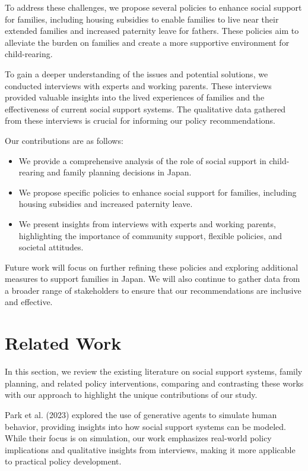\documentclass{article} %
\begin{document}
To address these challenges, we propose several policies to enhance social support for families, including housing subsidies to enable families to live near their extended families and increased paternity leave for fathers. These policies aim to alleviate the burden on families and create a more supportive environment for child-rearing.

To gain a deeper understanding of the issues and potential solutions, we conducted interviews with experts and working parents. These interviews provided valuable insights into the lived experiences of families and the effectiveness of current social support systems. The qualitative data gathered from these interviews is crucial for informing our policy recommendations.

Our contributions are as follows:
\begin{itemize}
    \item We provide a comprehensive analysis of the role of social support in child-rearing and family planning decisions in Japan.
    \item We propose specific policies to enhance social support for families, including housing subsidies and increased paternity leave.
    \item We present insights from interviews with experts and working parents, highlighting the importance of community support, flexible policies, and societal attitudes.
\end{itemize}

Future work will focus on further refining these policies and exploring additional measures to support families in Japan. We will also continue to gather data from a broader range of stakeholders to ensure that our recommendations are inclusive and effective.

\section{Related Work}
\label{sec:related}

In this section, we review the existing literature on social support systems, family planning, and related policy interventions, comparing and contrasting these works with our approach to highlight the unique contributions of our study.

Park et al. (2023) explored the use of generative agents to simulate human behavior, providing insights into how social support systems can be modeled. While their focus is on simulation, our work emphasizes real-world policy implications and qualitative insights from interviews, making it more applicable to practical policy development.
\end{document}
